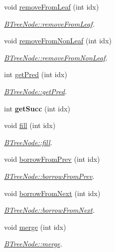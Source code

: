 \begin{DoxyCompactItemize}
\item 
void \hyperlink{classBTreeNode_a16d8905e906ebb4fce44dbb59cdae1a1}{remove\+From\+Leaf} (int idx)
\begin{DoxyCompactList}\small\item\em \hyperlink{classBTreeNode_a16d8905e906ebb4fce44dbb59cdae1a1}{B\+Tree\+Node\+::remove\+From\+Leaf}. \end{DoxyCompactList}\item 
void \hyperlink{classBTreeNode_aa6ee53b119d6ee874d664652c2eeba6e}{remove\+From\+Non\+Leaf} (int idx)
\begin{DoxyCompactList}\small\item\em \hyperlink{classBTreeNode_aa6ee53b119d6ee874d664652c2eeba6e}{B\+Tree\+Node\+::remove\+From\+Non\+Leaf}. \end{DoxyCompactList}\item 
int \hyperlink{classBTreeNode_a4a212d79e42c57cf3e8e4520f4cc7f04}{get\+Pred} (int idx)
\begin{DoxyCompactList}\small\item\em \hyperlink{classBTreeNode_a4a212d79e42c57cf3e8e4520f4cc7f04}{B\+Tree\+Node\+::get\+Pred}. \end{DoxyCompactList}\item 
int {\bfseries get\+Succ} (int idx)\hypertarget{classBTreeNode_a36e351cd08903051431eeba04498345e}{}\label{classBTreeNode_a36e351cd08903051431eeba04498345e}

\item 
void \hyperlink{classBTreeNode_acbcd10173cfb359b0368a14d3c5057f4}{fill} (int idx)
\begin{DoxyCompactList}\small\item\em \hyperlink{classBTreeNode_acbcd10173cfb359b0368a14d3c5057f4}{B\+Tree\+Node\+::fill}. \end{DoxyCompactList}\item 
void \hyperlink{classBTreeNode_aa9960b327fc4cfd9163cd95c221c5289}{borrow\+From\+Prev} (int idx)
\begin{DoxyCompactList}\small\item\em \hyperlink{classBTreeNode_aa9960b327fc4cfd9163cd95c221c5289}{B\+Tree\+Node\+::borrow\+From\+Prev}. \end{DoxyCompactList}\item 
void \hyperlink{classBTreeNode_ac952651fc8810a15c9056ea3ffa62506}{borrow\+From\+Next} (int idx)
\begin{DoxyCompactList}\small\item\em \hyperlink{classBTreeNode_ac952651fc8810a15c9056ea3ffa62506}{B\+Tree\+Node\+::borrow\+From\+Next}. \end{DoxyCompactList}\item 
void \hyperlink{classBTreeNode_acded44c5e6961efa0f78386973a9d0ef}{merge} (int idx)
\begin{DoxyCompactList}\small\item\em \hyperlink{classBTreeNode_acded44c5e6961efa0f78386973a9d0ef}{B\+Tree\+Node\+::merge}. \end{DoxyCompactList}\end{DoxyCompactItemize}
